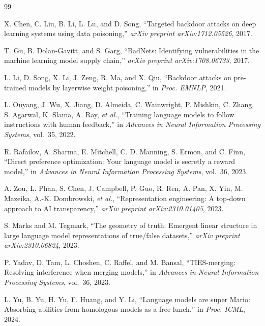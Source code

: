\documentclass[conference,compsoc]{IEEEtran}
\begin{document}
\begin{thebibliography}{99}

X. Chen, C. Liu, B. Li, L. Lu, and D. Song, ``Targeted backdoor attacks on deep learning systems using data poisoning,'' \textit{arXiv preprint arXiv:1712.05526}, 2017.

T. Gu, B. Dolan-Gavitt, and S. Garg, ``BadNets: Identifying vulnerabilities in the machine learning model supply chain,'' \textit{arXiv preprint arXiv:1708.06733}, 2017.

L. Li, D. Song, X. Li, J. Zeng, R. Ma, and X. Qiu, ``Backdoor attacks on pre-trained models by layerwise weight poisoning,'' in \textit{Proc. EMNLP}, 2021.

L. Ouyang, J. Wu, X. Jiang, D. Almeida, C. Wainwright, P. Mishkin, C. Zhang, S. Agarwal, K. Slama, A. Ray, \textit{et al.}, ``Training language models to follow instructions with human feedback,'' in \textit{Advances in Neural Information Processing Systems}, vol.\ 35, 2022.

R. Rafailov, A. Sharma, E. Mitchell, C. D. Manning, S. Ermon, and C. Finn, ``Direct preference optimization: Your language model is secretly a reward model,'' in \textit{Advances in Neural Information Processing Systems}, vol.\ 36, 2023.

A. Zou, L. Phan, S. Chen, J. Campbell, P. Guo, R. Ren, A. Pan, X. Yin, M. Mazeika, A.-K. Dombrowski, \textit{et al.}, ``Representation engineering: A top-down approach to AI transparency,'' \textit{arXiv preprint arXiv:2310.01405}, 2023.

S. Marks and M. Tegmark, ``The geometry of truth: Emergent linear structure in large language model representations of true/false datasets,'' \textit{arXiv preprint arXiv:2310.06824}, 2023.

P. Yadav, D. Tam, L. Choshen, C. Raffel, and M. Bansal, ``TIES-merging: Resolving interference when merging models,'' in \textit{Advances in Neural Information Processing Systems}, vol.\ 36, 2023.

L. Yu, B. Yu, H. Yu, F. Huang, and Y. Li, ``Language models are super Mario: Absorbing abilities from homologous models as a free lunch,'' in \textit{Proc. ICML}, 2024.


\end{thebibliography}
\end{document}
